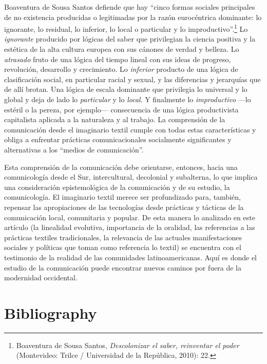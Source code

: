 \documentclass{tufte-handout}
\begin{document}
Boaventura de Sousa Santos defiende que hay ``cinco formas sociales
principales de no existencia producidas o legitimadas por la razón
eurocéntrica dominante: lo ignorante, lo residual, lo inferior, lo local
o particular y lo improductivo''.\footnote{Boaventura de Sousa Santos,
  \emph{Descolonizar el saber, reinventar el poder} (Montevideo: Trilce
  / Universidad de la República, 2010): 22.} Lo \emph{ignorante}
producido por lógicas del saber que privilegian la ciencia positiva y la
estética de la alta cultura europea con sus cánones de verdad y belleza.
Lo \emph{atrasado} fruto de una lógica del tiempo lineal con sus ideas
de progreso, revolución, desarrollo y crecimiento. Lo \emph{inferior}
producto de una lógica de clasificación social, en particular racial y
sexual, y las diferencias y jerarquías que de allí brotan. Una lógica de
escala dominante que privilegia lo universal y lo global y deja de lado
lo \emph{particular} y lo \emph{local}. Y finalmente lo
\emph{improductivo} ---lo estéril o la pereza, por ejemplo---
consecuencia de una lógica productivista capitalista aplicada a la
naturaleza y al trabajo. La comprensión de la comunicación desde el
imaginario textil cumple con todas estas características y obliga a
enfrentar prácticas comunicacionales socialmente significantes y
alternativas a los ``medios de comunicación''.

Esta comprensión de la comunicación debe orientarse, entonces, hacia una
comunicología desde el Sur, intercultural, decolonial y subalterna, lo
que implica una consideración epistemológica de la comunicación y de su
estudio, la comunicología. El imaginario textil merece ser profundizado
para, también, repensar las apropiaciones de las tecnologías desde
prácticas y tácticas de la comunicación local, comunitaria y popular. De
esta manera lo analizado en este artículo (la linealidad evolutiva,
importancia de la oralidad, las referencias a las prácticas textiles
tradicionales, la relevancia de las actuales manifestaciones sociales y
políticas que toman como referencia lo textil) se encuentra con el
testimonio de la realidad de las comunidades latinoamericanas. Aquí es
donde el estudio de la comunicación puede encontrar nuevos caminos por
fuera de la modernidad occidental.




\section{Bibliography}\label{bibliography}
\end{document}

